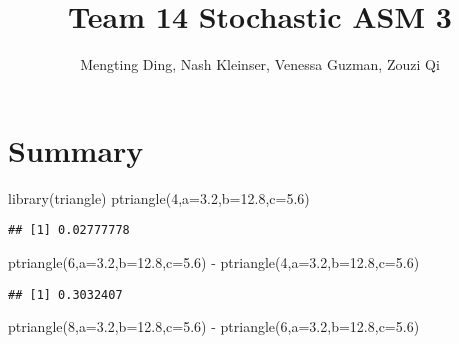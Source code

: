 \documentclass[
]{article}
\title{Team 14 Stochastic ASM 3}
\author{Mengting Ding, Nash Kleinser, Venessa Guzman, Zouzi Qi}
\date{}
\newenvironment{Shaded}{\begin{snugshade}}{\end{snugshade}}
\newcommand{\AttributeTok}[1]{\textcolor[rgb]{0.77,0.63,0.00}{#1}}
\newcommand{\DecValTok}[1]{\textcolor[rgb]{0.00,0.00,0.81}{#1}}
\newcommand{\FloatTok}[1]{\textcolor[rgb]{0.00,0.00,0.81}{#1}}
\newcommand{\FunctionTok}[1]{\textcolor[rgb]{0.00,0.00,0.00}{#1}}
\newcommand{\NormalTok}[1]{#1}
\newcommand{\SpecialCharTok}[1]{\textcolor[rgb]{0.00,0.00,0.00}{#1}}
\begin{document}
\maketitle

\hypertarget{summary}{%
\section{Summary}\label{summary}}

\begin{Shaded}
\begin{Highlighting}[]
\FunctionTok{library}\NormalTok{(triangle)}
\FunctionTok{ptriangle}\NormalTok{(}\DecValTok{4}\NormalTok{,}\AttributeTok{a=}\FloatTok{3.2}\NormalTok{,}\AttributeTok{b=}\FloatTok{12.8}\NormalTok{,}\AttributeTok{c=}\FloatTok{5.6}\NormalTok{)}
\end{Highlighting}
\end{Shaded}

\begin{verbatim}
## [1] 0.02777778
\end{verbatim}

\begin{Shaded}
\begin{Highlighting}[]
\FunctionTok{ptriangle}\NormalTok{(}\DecValTok{6}\NormalTok{,}\AttributeTok{a=}\FloatTok{3.2}\NormalTok{,}\AttributeTok{b=}\FloatTok{12.8}\NormalTok{,}\AttributeTok{c=}\FloatTok{5.6}\NormalTok{) }\SpecialCharTok{{-}} \FunctionTok{ptriangle}\NormalTok{(}\DecValTok{4}\NormalTok{,}\AttributeTok{a=}\FloatTok{3.2}\NormalTok{,}\AttributeTok{b=}\FloatTok{12.8}\NormalTok{,}\AttributeTok{c=}\FloatTok{5.6}\NormalTok{)}
\end{Highlighting}
\end{Shaded}

\begin{verbatim}
## [1] 0.3032407
\end{verbatim}

\begin{Shaded}
\begin{Highlighting}[]
\FunctionTok{ptriangle}\NormalTok{(}\DecValTok{8}\NormalTok{,}\AttributeTok{a=}\FloatTok{3.2}\NormalTok{,}\AttributeTok{b=}\FloatTok{12.8}\NormalTok{,}\AttributeTok{c=}\FloatTok{5.6}\NormalTok{) }\SpecialCharTok{{-}} \FunctionTok{ptriangle}\NormalTok{(}\DecValTok{6}\NormalTok{,}\AttributeTok{a=}\FloatTok{3.2}\NormalTok{,}\AttributeTok{b=}\FloatTok{12.8}\NormalTok{,}\AttributeTok{c=}\FloatTok{5.6}\NormalTok{)}
\end{Highlighting}
\end{Shaded}
\end{document}
